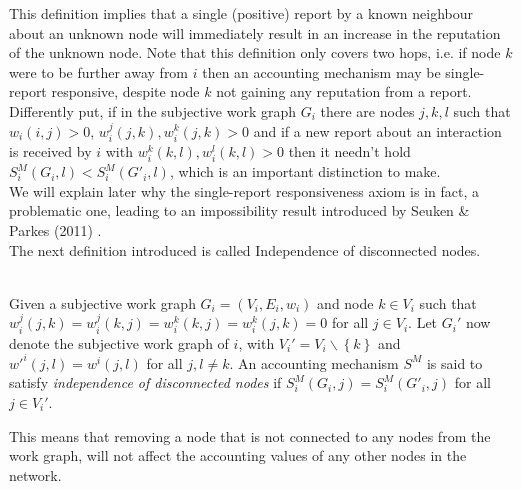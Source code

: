 \noindent{}This definition implies that a single (positive) report by a known neighbour about an unknown node will immediately result in an increase in the reputation of the unknown node. Note that this definition only covers two hops, i.e. if node $k$ were to be further away from $i$ then an accounting mechanism may be single-report responsive, despite node $k$ not gaining any reputation from a report.\vspace{1em}\\

\noindent{}Differently put, if in the subjective work graph $G_i$ there are nodes $j,k,l$ such that $w_i(i,j)>0$, $w_i^j(j,k),w_i^k(j,k)>0$ and if a new report about an interaction is received by $i$ with $w_i^k(k,l),w_i^l(k,l)>0$ then it needn't hold $S^M_i(G_i,l) < S^M_i(G'_i,l)$, which is an important distinction to make. \vspace{1em}\\

\noindent{}We will explain later why the single-report responsiveness axiom is in fact, a problematic one, leading to an impossibility result introduced by Seuken \& Parkes (2011) \cite{On the Sybil-Proofness of Accounting Mechanisms}. \vspace{1em}\\

\noindent{}The next definition introduced is called Independence of disconnected nodes. \vspace{1em}\\

\begin{definition}\ \\
\label{def:Independence of Disconnected Nodes}
\noindent{}Given a subjective work graph $G_i=(V_i,E_i,w_i)$ and node $k\in{}V_i$ such that $w_i^j(j,k)=w_i^j(k,j)=w_i^k(k,j)=w_i^k(j,k)=0$ for all $j\in{}V_i$. Let $G_i'$ now denote the subjective work graph of $i$, with $V_i'=V_i\backslash{}\left\lbrace{}k\right\rbrace$ and $w'^i(j,l)=w^i(j,l)$ for all $j,l\neq{}k$. An accounting mechanism $S^M$ is said to satisfy {\it independence of disconnected nodes} if $S^M_i(G_i,j)=S^M_i(G'_i,j)$ for all $j\in{}V_i'$.  
\end{definition}
\noindent{}This means that removing a node that is not connected to any nodes from the work graph, will not affect the accounting values of any other nodes in the network.\vspace{1em}\\

